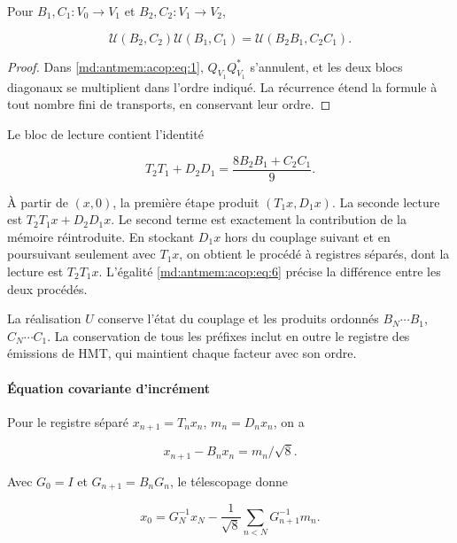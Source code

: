 Pour \(B_1,C_1:V_0\to V_1\) et \(B_2,C_2:V_1\to V_2\),

\begin{equation}
\boxed{\mathcal U(B_2,C_2)\mathcal U(B_1,C_1)
=\mathcal U(B_2B_1,C_2C_1).}
\label{md:antmem:acop:eq:5}
\end{equation}

\begin{proof}
Dans \eqref{md:antmem:acop:eq:1}, \(Q_{V_1}Q_{V_1}^*\) s’annulent, et les deux blocs diagonaux se multiplient dans l’ordre indiqué. La récurrence étend la formule à tout nombre fini de transports, en conservant leur ordre.

\end{proof}

Le bloc de lecture contient l’identité

\begin{equation}
\boxed{T_2T_1+D_2D_1=\frac{8B_2B_1+C_2C_1}{9}.}
\label{md:antmem:acop:eq:6}
\end{equation}

À partir de \((x,0)\), la première étape produit \((T_1x,D_1x)\). La seconde lecture est \(T_2T_1x+D_2D_1x\). Le second terme est exactement la contribution de la mémoire réintroduite. En stockant \(D_1x\) hors du couplage suivant et en poursuivant seulement avec \(T_1x\), on obtient le procédé à registres séparés, dont la lecture est \(T_2T_1x\). L’égalité \eqref{md:antmem:acop:eq:6} précise la différence entre les deux procédés.

La réalisation \(U\) conserve l’état du couplage et les produits ordonnés \(B_N\cdots B_1\), \(C_N\cdots C_1\). La conservation de tous les préfixes inclut en outre le registre des émissions de HMT, qui maintient chaque facteur avec son ordre.

\paragraph{Équation covariante d’incrément
}

Pour le registre séparé \(x_{n+1}=T_nx_n\), \(m_n=D_nx_n\), on a


\begin{equation}
x_{n+1}-B_nx_n=m_n/\sqrt8.
\label{md:antmem:acop:eq:7}
\end{equation}

Avec \(G_0=I\) et \(G_{n+1}=B_nG_n\), le télescopage donne


\begin{equation}
x_0=G_N^{-1}x_N-\frac1{\sqrt8}\sum_{n<N}G_{n+1}^{-1}m_n.
\label{md:antmem:acop:eq:8}
\end{equation}

